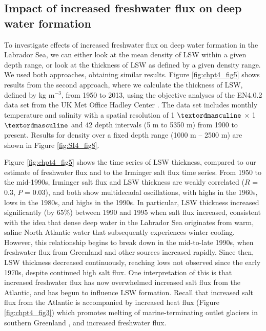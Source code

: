 \subsection{Impact of increased freshwater flux on deep water formation}
To investigate effects of increased freshwater flux on deep water formation in the Labrador Sea, we can either look at the mean density of LSW within a given depth range, or look at the thickness of LSW as defined by a given density range.  We used both approaches, obtaining similar results. Figure \ref{fig:chpt4_fig5} shows results from the second approach, where we calculate the thickness of LSW, defined by   kg m$^{-3}$, from 1950 to 2013, using the objective analyses of the EN4.0.2 data set from the UK Met Office Hadley Center \cite[]{good2013}.  The data set includes monthly temperature and salinity with a spatial resolution of 1 $\textordmasculine$ $\times$ 1 $\textordmasculine$ and 42 depth intervals (5 m to 5350 m) from 1900 to present.  Results for density over a fixed depth range (1000 m – 2500 m) are shown in Figure \ref{fig:SI4_fig8}.
  
Figure \ref{fig:chpt4_fig5} shows the time series of LSW thickness, compared to our estimate of freshwater flux and to the Irminger salt flux time series.  From 1950 to the mid-1990s, Irminger salt flux and LSW thickness are weakly correlated ($R$ = 0.3, $P$ = 0.03), and both show multidecadal oscillations, with highs in the 1960s, lows in the 1980s, and highs in the 1990s.  In particular, LSW thickness increased significantly (by 65\%) between 1990 and 1995 when salt flux increased, consistent with the idea that dense deep water in the Labrador Sea originates from warm, saline North Atlantic water that subsequently experiences winter cooling.  However, this relationship begins to break down in the mid-to-late 1990s, when freshwater flux from Greenland and other sources increased rapidly.  Since then, LSW thickness decreased continuously, reaching lows not observed since the early 1970s, despite continued high salt flux.  One interpretation of this is that increased freshwater flux has now overwhelmed increased salt flux from the Atlantic, and has begun to influence LSW formation.  Recall that increased salt flux from the Atlantic is accompanied by increased heat flux (Figure \ref{fig:chpt4_fig3}) which promotes melting of marine-terminating outlet glaciers in southern Greenland \cite[]{holland2008,rignot2006}, and increased freshwater flux.  

